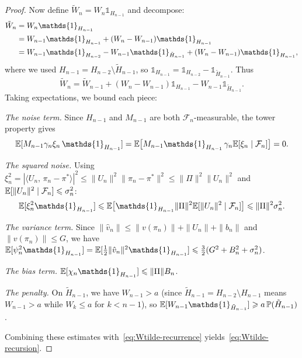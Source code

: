 \documentclass[a4paper,oneside,11pt]{report}
\newcommand{\ind}{\mathds{1}}
\newcommand{\Prob}{\mathbb{P}}
\newcommand{\calF}{\mathcal{F}}
\newcommand{\ip}[2]{\langle #1,\, #2 \rangle}
\newcommand{\norm}[1]{\| #1 \|}
\numberwithin{theorem}{chapter}
\numberwithin{equation}{chapter}
\begin{document}
\begin{proof}
  Now define $\tilde W_n = W_n \ind_{H_{n-1}}$ and decompose:
  \begin{align}
    \tilde W_n &= W_n \ind_{H_{n-1}} \notag\\
    &= W_{n-1} \ind_{H_{n-1}} + (W_n - W_{n-1})\ind_{H_{n-1}} \notag\\
    &= W_{n-1} \ind_{H_{n-2}} - W_{n-1}\ind_{\tilde H_{n-1}}
      + (W_n - W_{n-1})\ind_{H_{n-1}},
    \label{eq:Wtilde-decomp}
  \end{align}
  where we used $H_{n-1} = H_{n-2} \setminus \tilde H_{n-1}$, so
  $\ind_{H_{n-1}} = \ind_{H_{n-2}} - \ind_{\tilde H_{n-1}}$. Thus
  \begin{equation}
    \tilde W_n = \tilde W_{n-1}
    + (W_n - W_{n-1})\ind_{H_{n-1}}
    - W_{n-1}\ind_{\tilde H_{n-1}}.
    \label{eq:Wtilde-recurrence}
  \end{equation}
  Taking expectations, we bound each piece:

  \emph{The noise term.}  Since $H_{n-1}$ and $M_{n-1}$ are both
  $\calF_n$-measurable, the tower property gives
  \begin{equation}
    \E[M_{n-1}\gamma_n\xi_n\, \ind_{H_{n-1}}]
    = \E\bigl[M_{n-1}\ind_{H_{n-1}}\,
      \gamma_n \E[\xi_n \mid \calF_n]\bigr] = 0.
    \label{eq:noise-vanishes}
  \end{equation}

  \emph{The squared noise.}  Using
  $\xi_n^2 = |\ip{U_n}{\pi_n-\pi^*}|^2
  \le \norm{U_n}^2 \norm{\pi_n-\pi^*}^2 \le \norm{\Pi}^2 \norm{U_n}^2$
  and $\E[\norm{U_n}^2 \mid \calF_n] \le \sigma_n^2$:
  \begin{equation}
    \E[\xi_n^2 \ind_{H_{n-1}}]
    \le \E\bigl[\ind_{H_{n-1}} \norm{\Pi}^2
      \E[\norm{U_n}^2 \mid \calF_n]\bigr]
    \le \norm{\Pi}^2 \sigma_n^2.
    \label{eq:xi-sq-bound}
  \end{equation}

  \emph{The variance term.}  Since
  $\norm{\hat v_n} \le \norm{v(\pi_n)} + \norm{U_n} + \norm{b_n}$ and
  $\norm{v(\pi_n)} \le G$, we have
  $\E[\psi_n^2 \ind_{H_{n-1}}]
  = \E[\tfrac{1}{2}\norm{\hat v_n}^2 \ind_{H_{n-1}}]
  \le \tfrac{3}{2}(G^2 + B_n^2 + \sigma_n^2)$.

  \emph{The bias term.}
  $\E[\chi_n\ind_{H_{n-1}}] \le \norm{\Pi} B_n$.

  \emph{The penalty.}  On $\tilde H_{n-1}$, we have $W_{n-1} > a$
  (since $\tilde H_{n-1} = H_{n-2} \setminus H_{n-1}$ means $W_{n-1}>a$
  while $W_k \le a$ for $k < n-1$), so
  $\E[W_{n-1}\ind_{\tilde H_{n-1}}] \ge a\, \Prob(\tilde H_{n-1})$.

  Combining these estimates with~\eqref{eq:Wtilde-recurrence} yields~\eqref{eq:Wtilde-recursion}.
\end{proof}
\end{document}
